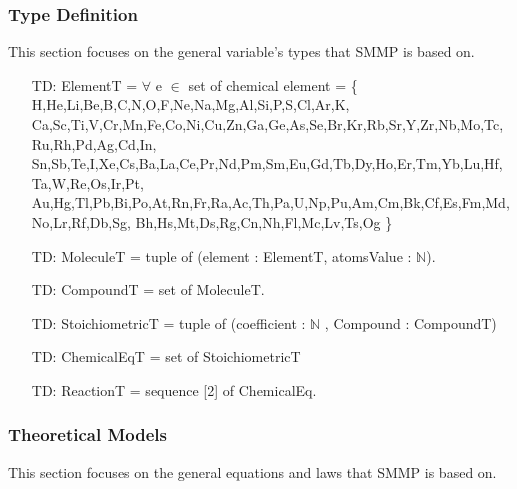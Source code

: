 \documentclass[12pt]{article}
\newcounter{typenum} %
\begin{document}
\subsubsection{Type Definition}\label{Type_Detention}

This section focuses on the general variable's types that SMMP is based on.  
\begin{itemize}
\item[TD\refstepcounter{typenum}\thetypenum \label{elementT}:] ElementT = $\forall$ e $\in$ set of chemical element = 
\{ H,He,Li,Be,B,C,N,O,F,Ne,Na,Mg,Al,Si,P,S,Cl,Ar,K,
Ca,Sc,Ti,V,Cr,Mn,Fe,Co,Ni,Cu,Zn,Ga,Ge,As,Se,Br,Kr,Rb,Sr,Y,Zr,Nb,Mo,Tc,Ru,Rh,Pd,Ag,Cd,In,
Sn,Sb,Te,I,Xe,Cs,Ba,La,Ce,Pr,Nd,Pm,Sm,Eu,Gd,Tb,Dy,Ho,Er,Tm,Yb,Lu,Hf,Ta,W,Re,Os,Ir,Pt,
Au,Hg,Tl,Pb,Bi,Po,At,Rn,Fr,Ra,Ac,Th,Pa,U,Np,Pu,Am,Cm,Bk,Cf,Es,Fm,Md,No,Lr,Rf,Db,Sg,
Bh,Hs,Mt,Ds,Rg,Cn,Nh,Fl,Mc,Lv,Ts,Og \}
\item[TD\refstepcounter{typenum}\thetypenum \label{MoleculeT}:] MoleculeT = tuple of (element : ElementT, atomsValue : $\mathbb{N}$).
\item[TD\refstepcounter{typenum}\thetypenum \label{CompoundT}:]  CompoundT =   set of MoleculeT.
\item[TD\refstepcounter{typenum}\thetypenum \label{StoichiometricT}:]  StoichiometricT =   tuple of (coefficient : $\mathbb{N}$ , Compound : CompoundT)
\item[TD\refstepcounter{typenum}\thetypenum \label{ChemicalEqT}:] ChemicalEqT = set of StoichiometricT \item[TD\refstepcounter{typenum}\thetypenum \label{ReactionT}:] ReactionT =  sequence [2] of ChemicalEq.
\end{itemize}



\subsubsection{Theoretical Models}\label{sec_theoretical}

This section focuses on the general equations and laws that SMMP is based on.  

~\newline
\end{document}
